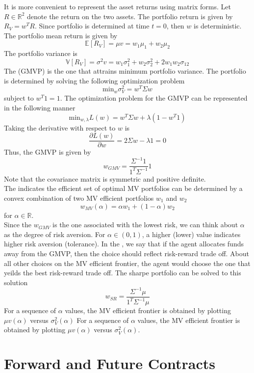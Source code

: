 \documentclass{article}
\begin{document}
It is more convenient to represent the asset returns using matrix forms. Let $R \in \mathbb{R}^2$ denote the return on the two assets. The portfolio return is given by $R_V = w^{T}R$. Since portfolio is determined at time $t=0$, then $w$ is deterministic. The portfolio mean return is given by $$\mathbb{E}[R_V] = \mu v = w_1 \mu_1 + w_2 \mu_2$$ The portfolio variance is $$\mathbb{V}[R_V] = \sigma^2 v = w_{1} \sigma_{1}^{2} + w_{2} \sigma_{2}^{2} + 2 w_1 w_2 \sigma_{12}$$ The  (GMVP) is the one that attrains minimum portfolio variance. The portfolio is determined by solving the following optimization problem $$\textrm{min}_w \sigma^{2}_{V} = w^{T} \Sigma w$$ subject to $w^{T} 1 = 1$. The optimization problem for the GMVP can be represented in the following manner $$\textrm{min}_{w, \lambda}L(w) = w^{T} \Sigma w + \lambda (1 - w^{T} 1)$$ Taking the derivative with respect to $w$ is $$\frac{\partial L(w)}{\partial w} = 2 \Sigma w - \lambda 1 = 0$$ Thus, the GMVP is given by $$w_{GMV} = \frac{\Sigma^{-1}1}{1^{T} \Sigma^{-1}}1$$ Note that the covariance matrix is symmetric and positive definite. \\ 

The  indicates the efficient set of optimal MV portfolios can be determined by a convex combination of two MV efficient portfolios $w_1$ and $w_2$ $$w_{MV}(\alpha) = \alpha w_1 + (1 - \alpha) w_2$$ for $\alpha \in \mathbb{R}$. \\ 

Since the $w_{GMV}$ is the one associated with the lowest risk, we can think about $\alpha$ as the degree of risk aversion. For $\alpha \in (0,1)$, a higher (lower) value indicates higher risk aversion (tolerance). In the , we say that if the agent allocates funds away from the GMVP, then the choice should reflect risk-reward trade off. About all other choices on the MV efficient frontier, the agent would choose the one that yeilds the best risk-reward trade off. The sharpe portfolio can be solved to this solution $$w_{SR} = \frac{\Sigma^{-1} \mu}{1^{T} \Sigma^{-1} \mu}$$ For a sequence of $\alpha$ values, the MV efficient frontier is obtained by plotting $\mu v (\alpha)$ versus $\sigma_{V}^{2}(\alpha)$ For a sequence of $\alpha$ values, the MV efficient frontier is obtained by plotting $\mu v (\alpha)$ versus $\sigma_{V}^{2}(\alpha)$. \\

\section{Forward and Future Contracts}
\end{document}
